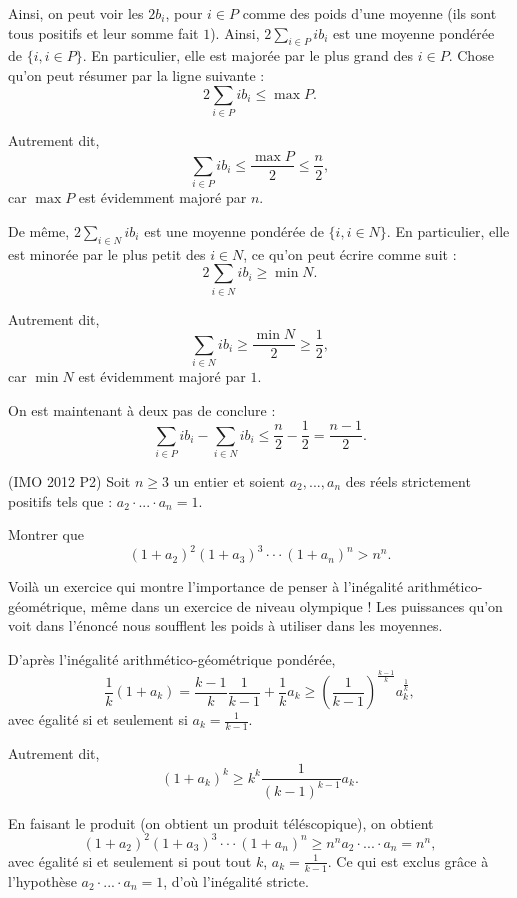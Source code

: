 \begin{sol}
Ainsi, on peut voir les $2b_i$, pour $i \in P$ comme des poids d'une moyenne (ils sont tous positifs et leur somme fait $1$). Ainsi, $2\sum_{i \in P} ib_i$ est une moyenne pondérée de $\{i,i \in P\}$. En particulier, elle est majorée par le plus grand des $i \in P$. Chose qu'on peut résumer par la ligne suivante :
\[
2\sum_{i \in P} ib_i \leq \max P.
\]

Autrement dit,
\[
\sum_{i \in P} ib_i \leq \frac{\max P}2 \leq \frac{n}2,
\]
car $\max P$ est évidemment majoré par $n$.

De même, $2 \sum_{i \in N} ib_i$ est une moyenne pondérée de $\{i,i \in N\}$. En particulier, elle est minorée par le plus petit des $i \in N$, ce qu'on peut écrire comme suit :
\[
2\sum_{i \in N} ib_i \geq \min N.
\]

Autrement dit,
\[
\sum_{i \in N} ib_i \geq \frac{\min N}2 \geq \frac12,
\]
car $\min N$ est évidemment majoré par $1$.

On est maintenant à deux pas de conclure :
\[
\sum_{i \in P} ib_i - \sum_{i \in N} ib_i \leq \frac{n}2 - \frac12 = \frac{n-1}2.
\]
\end{sol}

\begin{exo}
(IMO 2012 P2)
Soit $n \geq 3$ un entier et soient $a_2,...,a_n$ des réels strictement positifs tels que : $a_2 \cdot ... \cdot a_n =1$.

Montrer que
\[
(1+a_2)^2(1+a_3)^3 \cdot \cdot \cdot (1+a_n)^n > n^n.
\]
\end{exo}

\begin{sol}
Voilà un exercice qui montre l'importance de penser à l'inégalité arithmético-géométrique, même dans un exercice de niveau olympique ! Les puissances qu'on voit dans l'énoncé nous soufflent les poids à utiliser dans les moyennes.

D'après l'inégalité arithmético-géométrique pondérée,
\[
\frac1{k}(1+a_k) = \frac{k-1}{k} \frac1{k-1} + \frac1{k} a_k \geq \left(\frac1{k-1}\right)^{\frac{k-1}{k}}a_k^{\frac1{k}},
\]
avec égalité si et seulement si $a_k = \frac1{k-1}$.

Autrement dit,
\[
(1+a_k)^k \geq k^k \frac1{(k-1)^{k-1}} a_k.
\]

En faisant le produit (on obtient un produit téléscopique), on obtient
\[
(1+a_2)^2(1+a_3)^3 \cdot \cdot \cdot (1+a_n)^n \geq n^n a_2 \cdot ... \cdot a_n = n^n,
\]
avec égalité si et seulement si pout tout $k$, $a_k = \frac1{k-1}$. Ce qui est exclus grâce à l'hypothèse $a_2 \cdot ... \cdot a_n =1$, d'où l'inégalité stricte.
\end{sol}


